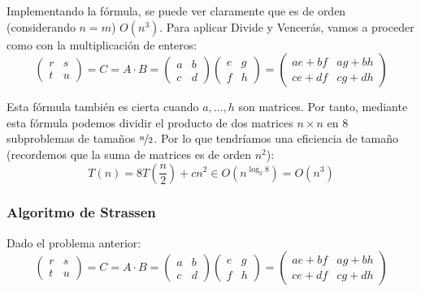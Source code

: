 Implementando la fórmula, se puede ver claramente que es de orden (considerando $n = m$) $O(n^3)$. Para aplicar Divide y Vencerás, vamos a proceder como con la multiplicación de enteros:
\begin{equation*}
    \begin{pmatrix}
        r & s \\
        t & u
        \end{pmatrix} = C = A \cdot B = \begin{pmatrix}
        a & b \\
        c & d
        \end{pmatrix} \begin{pmatrix}
        e & g \\
        f & h
        \end{pmatrix} = \begin{pmatrix}
        ae+bf & ag+bh \\
        ce + df & cg + dh
    \end{pmatrix}
\end{equation*}

Esta fórmula también es cierta cuando $a, \ldots, h$ son matrices. Por tanto, mediante esta fórmula podemos dividir el producto de dos matrices $n \times n$ en 8 subproblemas de tamaños $\nicefrac{n}{2}$. Por lo que tendríamos una eficiencia de tamaño (recordemos que la suma de matrices es de orden $n^2$):
\begin{equation*}
    T(n) = 8T\left(\dfrac{n}{2}\right) + cn^2 \in O\left(n^{\log_2 8}\right) = O(n^3)
\end{equation*}

\subsubsection{Algoritmo de Strassen}
Dado el problema anterior:
\begin{equation*}
    \begin{pmatrix}
        r & s \\
        t & u
        \end{pmatrix} = C = A \cdot B = \begin{pmatrix}
        a & b \\
        c & d
        \end{pmatrix} \begin{pmatrix}
        e & g \\
        f & h
        \end{pmatrix} = \begin{pmatrix}
        ae+bf & ag+bh \\
        ce + df & cg + dh
    \end{pmatrix}
\end{equation*}

